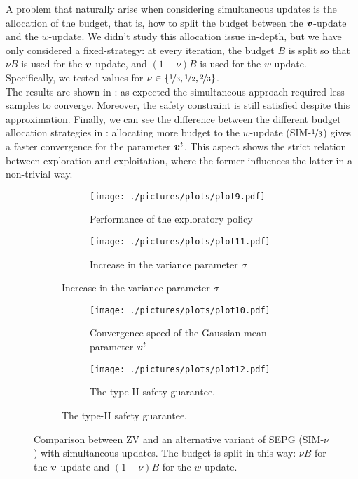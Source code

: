 A problem that naturally arise when considering simultaneous updates is the allocation of the budget, that is, how to split the budget between the $\boldsymbol{v}$-update and the $w$-update. We didn't study this allocation issue in-depth, but we have only considered a fixed-strategy: at every iteration, the budget $B$ is split so that $\nu B$ is used for the $\boldsymbol{v}$-update, and $(1-\nu)B$ is used for the $w$-update. Specifically, we tested values for $\nu \in \{\nicefrac{1}{3}, \nicefrac{1}{2}, \nicefrac{2}{3}\}$.\\
The results are shown in : as expected the simultaneous approach required less samples to converge. Moreover, the safety constraint is still satisfied despite this approximation. Finally, we can see the difference between the different budget allocation strategies in : allocating more budget to the $w$-update (SIM-$\nicefrac{1}{3}$) gives a faster convergence for the parameter $\boldsymbol{v}^t$. This aspect shows the strict relation between exploration and exploitation, where the former influences the latter in a non-trivial way.



\begin{figure}[t]
\centering
\begin{subfigure}[t]{\textwidth}
\begin{subfigure}[t]{0.5\textwidth}
\texttt{[image: ./pictures/plots/plot9.pdf]}
\caption{Performance of the exploratory policy} \label{fig:plot3-1}
\end{subfigure}
\hfill
\begin{subfigure}[t]{0.5\textwidth}
\texttt{[image: ./pictures/plots/plot11.pdf]}
\caption{Increase in the variance parameter $\sigma$} \label{fig:plot3-2}
\end{subfigure}
\end{subfigure}

\begin{subfigure}[t]{\textwidth}
\begin{subfigure}[t]{0.5\textwidth}
\texttt{[image: ./pictures/plots/plot10.pdf]}
\caption{Convergence speed of the Gaussian mean parameter $\boldsymbol{v}^t$} \label{fig:plot3-3}
\end{subfigure}
\hfill
\begin{subfigure}[t]{0.5\textwidth}
\texttt{[image: ./pictures/plots/plot12.pdf]}
\caption{The type-II safety guarantee. } \label{fig:plot3-4}
\end{subfigure}
\end{subfigure}

\caption[Comparison between ZV and SIM-$\nu$.]{Comparison between ZV and an alternative variant of SEPG (SIM-$\nu$) with simultaneous updates. The budget is split in this way: $\nu B$ for the $\boldsymbol{v}$-update and $(1-\nu)B$ for the $w$-update. }
\label{fig:plot3}
\end{figure}



